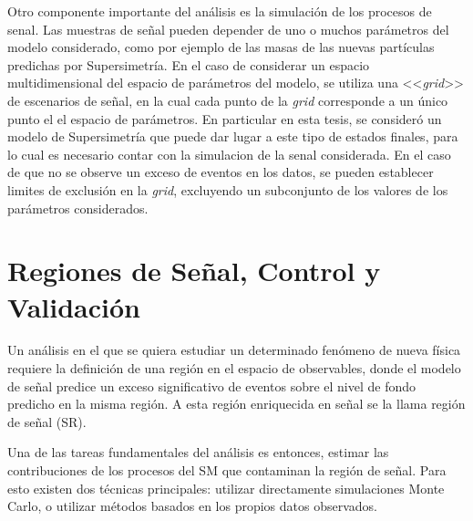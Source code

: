 Otro componente importante del análisis es la simulación de los procesos de
senal. Las muestras de señal pueden depender de uno o muchos parámetros del
modelo considerado, como por ejemplo de las masas de las nuevas partículas
predichas por Supersimetría. En el caso de considerar un espacio
multidimensional del espacio de parámetros del modelo, se utiliza una
<<\emph{grid}>> de escenarios de señal, en la cual cada punto de la \emph{grid}
corresponde a un único punto el el espacio de parámetros. En particular en esta
tesis, se consideró un modelo de Supersimetría que puede dar lugar a este tipo
de estados finales, para lo cual es necesario contar con la simulacion de la
senal considerada. En el caso de que no se observe un exceso de eventos en los
datos, se pueden establecer limites de exclusión en la \emph{grid}, excluyendo
un subconjunto de los valores de los parámetros considerados.


\section{Regiones de Señal, Control y Validación}
\label{sec:regiones}

Un análisis en el que se quiera estudiar un determinado fenómeno de nueva física
requiere la definición de una región en el espacio de observables, donde el modelo de señal
predice un exceso significativo de eventos sobre el nivel de fondo predicho en
la misma región. A esta región enriquecida en señal se la llama región de señal
(SR).

Una de las tareas fundamentales del análisis es entonces, estimar las
contribuciones de los procesos del SM que contaminan la región de
señal.
Para esto existen dos técnicas principales: utilizar directamente simulaciones Monte Carlo,
o utilizar métodos basados en los propios datos observados.


